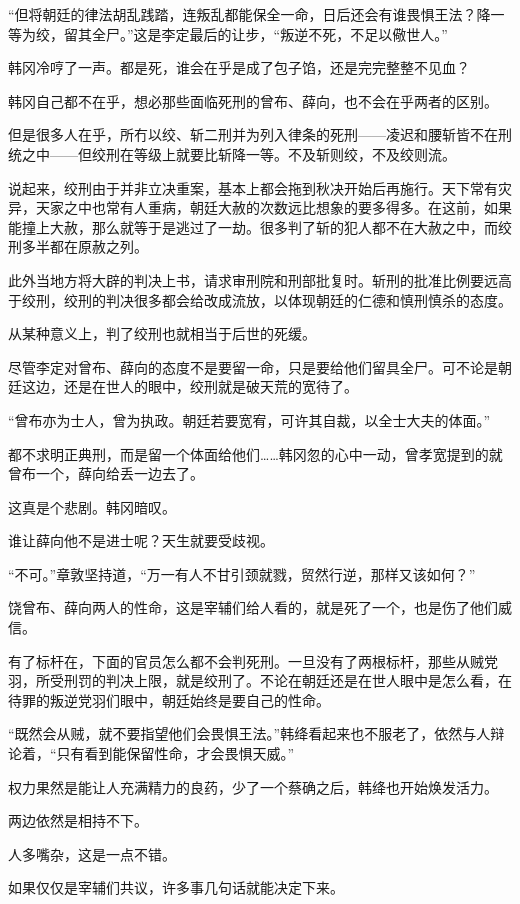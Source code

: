 “但将朝廷的律法胡乱践踏，连叛乱都能保全一命，日后还会有谁畏惧王法？降一等为绞，留其全尸。”这是李定最后的让步，“叛逆不死，不足以儆世人。”

韩冈冷哼了一声。都是死，谁会在乎是成了包子馅，还是完完整整不见血？

韩冈自己都不在乎，想必那些面临死刑的曾布、薛向，也不会在乎两者的区别。

但是很多人在乎，所冇以绞、斩二刑并为列入律条的死刑——凌迟和腰斩皆不在刑统之中——但绞刑在等级上就要比斩降一等。不及斩则绞，不及绞则流。

说起来，绞刑由于并非立决重案，基本上都会拖到秋决开始后再施行。天下常有灾异，天家之中也常有人重病，朝廷大赦的次数远比想象的要多得多。在这前，如果能撞上大赦，那么就等于是逃过了一劫。很多判了斩的犯人都不在大赦之中，而绞刑多半都在原赦之列。

此外当地方将大辟的判决上书，请求审刑院和刑部批复时。斩刑的批准比例要远高于绞刑，绞刑的判决很多都会给改成流放，以体现朝廷的仁德和慎刑慎杀的态度。

从某种意义上，判了绞刑也就相当于后世的死缓。

尽管李定对曾布、薛向的态度不是要留一命，只是要给他们留具全尸。可不论是朝廷这边，还是在世人的眼中，绞刑就是破天荒的宽待了。

“曾布亦为士人，曾为执政。朝廷若要宽宥，可许其自裁，以全士大夫的体面。”

都不求明正典刑，而是留一个体面给他们……韩冈忽的心中一动，曾孝宽提到的就曾布一个，薛向给丢一边去了。

这真是个悲剧。韩冈暗叹。

谁让薛向他不是进士呢？天生就要受歧视。

“不可。”章敦坚持道，“万一有人不甘引颈就戮，贸然行逆，那样又该如何？”

饶曾布、薛向两人的性命，这是宰辅们给人看的，就是死了一个，也是伤了他们威信。

有了标杆在，下面的官员怎么都不会判死刑。一旦没有了两根标杆，那些从贼党羽，所受刑罚的判决上限，就是绞刑了。不论在朝廷还是在世人眼中是怎么看，在待罪的叛逆党羽们眼中，朝廷始终是要自己的性命。

“既然会从贼，就不要指望他们会畏惧王法。”韩绛看起来也不服老了，依然与人辩论着，“只有看到能保留性命，才会畏惧天威。”

权力果然是能让人充满精力的良药，少了一个蔡确之后，韩绛也开始焕发活力。

两边依然是相持不下。

人多嘴杂，这是一点不错。

如果仅仅是宰辅们共议，许多事几句话就能决定下来。

